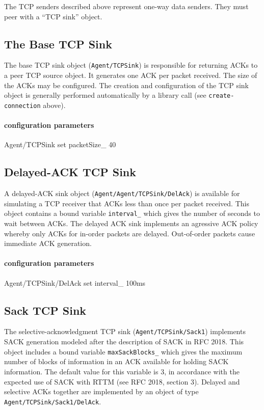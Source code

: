 The TCP senders described above represent one-way data senders.
They must peer with a ``TCP sink'' object.

\subsection{The Base TCP Sink}

The base TCP sink object ({\tt Agent/TCPSink})
is responsible for returning ACKs to
a peer TCP source object.
It generates one ACK per packet received.
The size of the ACKs may be configured.
The creation and configuration of the TCP sink object
is generally performed automatically by a library
call (see {\tt create-connection} above).

\paragraph{configuration parameters}
\begin{program}
        Agent/TCPSink set packetSize_ 40
\end{program}

\subsection{Delayed-ACK TCP Sink}

A delayed-ACK sink object ({\tt Agent/Agent/TCPSink/DelAck}) is available
for simulating a TCP receiver that ACKs less than once per packet received.
This object contains a bound variable {\tt interval\_} which gives the
number of seconds to wait between ACKs.
The delayed ACK sink implements an agressive ACK policy whereby
only ACKs for in-order packets are delayed.
Out-of-order packets cause immediate ACK generation.

\paragraph{configuration parameters}
\begin{program}
        Agent/TCPSink/DelAck set interval_ 100ms
\end{program}

\subsection{Sack TCP Sink}

The selective-acknowledgment TCP sink ({\tt Agent/TCPSink/Sack1}) implements
SACK generation modeled after the description of SACK in RFC 2018.
This object includes a bound variable {\tt maxSackBlocks\_} which gives
the maximum number of blocks of information in an ACK available for
holding SACK information.
The default value for this variable is 3, in accordance with the expected
use of SACK with RTTM (see RFC 2018, section 3).
Delayed and selective ACKs together are implemented by
an object of type {\tt Agent/TCPSink/Sack1/DelAck}.

